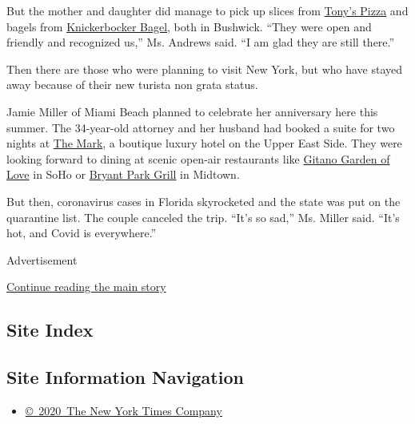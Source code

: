 But the mother and daughter did manage to pick up slices from
\href{https://originaltonysofbushwick.com/}{Tony's Pizza} and bagels
from \href{http://www.kbbagel.com/}{Knickerbocker Bagel}, both in
Bushwick. ``They were open and friendly and recognized us,'' Ms. Andrews
said. ``I am glad they are still there.''

Then there are those who were planning to visit New York, but who have
stayed away because of their new turista non grata status.

Jamie Miller of Miami Beach planned to celebrate her anniversary here
this summer. The 34-year-old attorney and her husband had booked a suite
for two nights at
\href{https://www.themarkhotel.com/?gclid=EAIaIQobChMIrKP4jvDu6gIVFaSzCh3SdAsCEAAYASAAEgJM-vD_BwE}{The
Mark}, a boutique luxury hotel on the Upper East Side. They were looking
forward to dining at scenic open-air restaurants like
\href{https://grupogitano.com/}{Gitano Garden of Love} in SoHo or
\href{https://bryantparkgrillnyc.com/}{Bryant Park Grill} in Midtown.

But then, coronavirus cases in Florida skyrocketed and the state was put
on the quarantine list. The couple canceled the trip. ``It's so sad,''
Ms. Miller said. ``It's hot, and Covid is everywhere.''

Advertisement

\protect\hyperlink{after-bottom}{Continue reading the main story}

\hypertarget{site-index}{%
\subsection{Site Index}\label{site-index}}

\hypertarget{site-information-navigation}{%
\subsection{Site Information
Navigation}\label{site-information-navigation}}

\begin{itemize}
\tightlist
\item
  \href{https://help.nytimes3xbfgragh.onion/hc/en-us/articles/115014792127-Copyright-notice}{©~2020~The
  New York Times Company}
\end{itemize}

